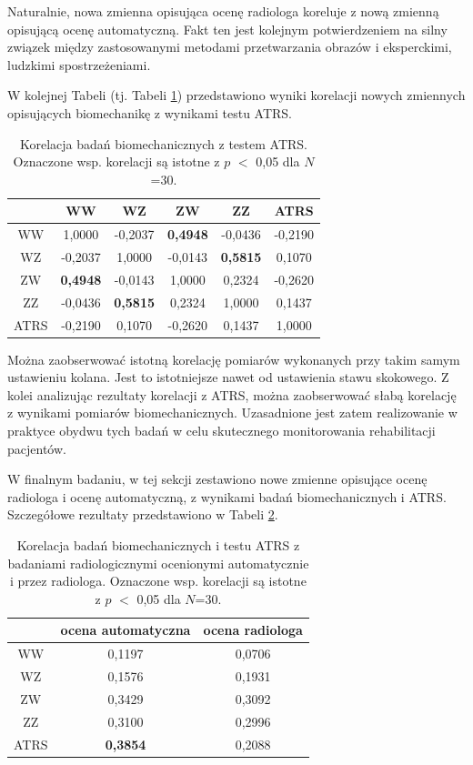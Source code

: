 Naturalnie, nowa zmienna opisująca ocenę radiologa koreluje z nową zmienną opisującą ocenę automatyczną. Fakt ten jest kolejnym potwierdzeniem na silny związek między zastosowanymi metodami przetwarzania obrazów i eksperckimi, ludzkimi spostrzeżeniami. 

W kolejnej Tabeli (tj. Tabeli \ref{tab:bioVSatrs}) przedstawiono wyniki korelacji nowych zmiennych opisujących biomechanikę z wynikami testu ATRS. 

\begin{table}[h]
	\centering
	\setlength{\tabcolsep}{3pt}
	\setlength\extrarowheight{2pt}
	\caption{Korelacja badań biomechanicznych z testem ATRS. Oznaczone wsp. korelacji są istotne z $p$ $<$ 0,05 dla $N$=30.}
	\label{tab:bioVSatrs}
	\begin{tabular}{c|c|c|c|c|c}
		&WW&WZ&ZW&ZZ&ATRS \\
		\hline \hline
		WW&1,0000&-0,2037&\textbf{0,4948}&-0,0436&-0,2190\\
		\hline
		WZ&-0,2037&1,0000&-0,0143&\textbf{0,5815}&0,1070\\
		\hline
		ZW&\textbf{0,4948}&-0,0143&1,0000&0,2324&-0,2620\\
		\hline
		ZZ&-0,0436&\textbf{0,5815}&0,2324&1,0000&0,1437\\
		\hline
		ATRS&-0,2190&0,1070&-0,2620&0,1437&1,0000\\
		
		
	\end{tabular}
\end{table}

Można zaobserwować istotną korelację pomiarów wykonanych przy takim samym ustawieniu kolana. Jest to istotniejsze nawet od ustawienia stawu skokowego. Z kolei analizując rezultaty korelacji z ATRS, można zaobserwować słabą korelację z wynikami pomiarów biomechanicznych. Uzasadnione jest zatem realizowanie w praktyce obydwu tych badań w celu skutecznego monitorowania rehabilitacji pacjentów.

W finalnym badaniu, w tej sekcji zestawiono nowe zmienne opisujące ocenę radiologa i ocenę automatyczną, z wynikami badań biomechanicznych i ATRS. Szczegółowe rezultaty przedstawiono w Tabeli \ref{tab:bioATRSvspredGT}.

\begin{table}[h]
	\centering
	\setlength{\tabcolsep}{3pt}
	\setlength\extrarowheight{2pt}
	\caption{Korelacja badań biomechanicznych i testu ATRS z badaniami radiologicznymi ocenionymi automatycznie i przez radiologa. Oznaczone wsp. korelacji są istotne z $p$ $<$ 0,05 dla $N$=30.}
	\label{tab:bioATRSvspredGT}
	\begin{tabular}{c|c|c}
		&ocena automatyczna&ocena radiologa \\
		\hline \hline
		WW&0,1197&0,0706\\
		\hline
		WZ&0,1576&0,1931\\
		\hline
		ZW&0,3429&0,3092\\
		\hline
		ZZ&0,3100&0,2996\\
		\hline
		ATRS&\textbf{0,3854}&0,2088\\
		
	
	\end{tabular}
\end{table}

